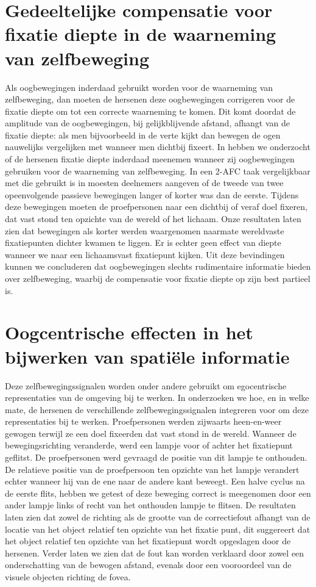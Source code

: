 \section{Gedeeltelijke compensatie voor fixatie diepte in de waarneming van zelfbeweging}
Als oogbewegingen inderdaad gebruikt worden voor de waarneming van zelfbeweging, dan moeten de hersenen deze oogbewegingen corrigeren voor de fixatie diepte om tot een correcte waarneming te komen. Dit komt doordat de amplitude van de oogbewegingen, bij gelijkblijvende afstand, afhangt van de fixatie diepte: als men bijvoorbeeld in de verte kijkt dan bewegen de ogen nauwelijks vergelijken met wanneer men dichtbij fixeert. In  hebben we onderzocht of de hersenen fixatie diepte inderdaad meenemen wanneer zij oogbewegingen gebruiken voor de waarneming van zelfbeweging. In een 2-AFC taak vergelijkbaar met die gebruikt is in  moesten deelnemers aangeven of de tweede van twee opeenvolgende passieve bewegingen langer of korter was dan de eerste. Tijdens deze bewegingen moeten de proefpersonen naar een dichtbij of veraf doel fixeren, dat vast stond ten opzichte van de wereld of het lichaam. Onze resultaten laten zien dat bewegingen als korter werden waargenomen naarmate wereldvaste fixatiepunten dichter kwamen te liggen. Er is echter geen effect van diepte wanneer we naar een lichaamsvast fixatiepunt kijken. Uit deze bevindingen kunnen we concluderen dat oogbewegingen slechts rudimentaire informatie bieden over zelfbeweging, waarbij de compensatie voor fixatie diepte op zijn best partieel is.

\section{Oogcentrische effecten in het bijwerken van spati\"ele informatie}
Deze zelfbewegingssignalen worden onder andere gebruikt om egocentrische representaties van de omgeving bij te werken. In  onderzoeken we hoe, en in welke mate, de hersenen de verschillende zelfbewegingssignalen integreren voor om deze representaties bij te werken. Proefpersonen werden zijwaarts heen-en-weer gewogen terwijl ze een doel fixeerden dat vast stond in de wereld. Wanneer de bewegingsrichting veranderde, werd een lampje voor of achter het fixatiepunt geflitst. De proefpersonen werd gevraagd de positie van dit lampje te onthouden. De relatieve positie van de proefpersoon ten opzichte van het lampje verandert echter wanneer hij van de ene naar de andere kant beweegt. Een halve cyclus na de eerste flits, hebben we getest of deze beweging correct is meegenomen door een ander lampje links of recht van het onthouden lampje te flitsen. De resultaten laten zien dat zowel de richting als de grootte van de correctiefout afhangt van de locatie van het object relatief ten opzichte van het fixatie punt, dit suggereert dat het object relatief ten opzichte van het fixatiepunt wordt opgeslagen door de hersenen. Verder laten we zien dat de fout kan worden verklaard door zowel een onderschatting van de bewogen afstand, evenals door een vooroordeel van de visuele objecten richting de fovea.

